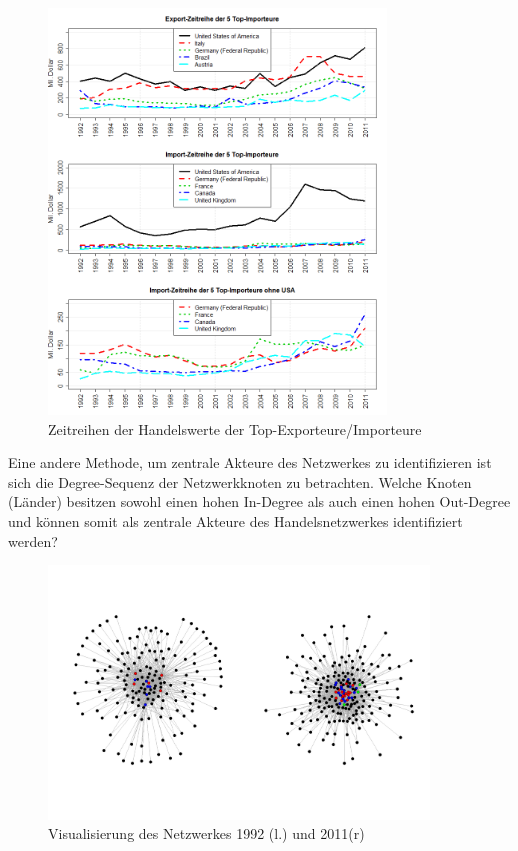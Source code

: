 \documentclass[a4paper,ngerman,oneside,titlepage,bibliography=totoc,11pt]{scrreprt}
\begin{document}
\begin{figure}[ht]
	\centering
		\includegraphics[width= 0.8\textwidth]{Grafiken/ts_tops.png}
	\caption{Zeitreihen der Handelswerte der Top-Exporteure/Importeure}
	\label{fig:ts_tops}
\end{figure}
Eine andere Methode, um zentrale Akteure des Netzwerkes zu identifizieren ist sich die Degree-Sequenz der Netzwerkknoten zu betrachten. Welche Knoten (Länder) besitzen sowohl einen hohen In-Degree als auch einen hohen Out-Degree und können somit als zentrale Akteure des Handelsnetzwerkes identifiziert werden?
\begin{figure}[ht]
	\centering
		\includegraphics[width=0.90\textwidth]{Grafiken/ts_network.png}
	\caption{Visualisierung des Netzwerkes 1992 (l.) und 2011(r)}
	\label{fig:ts_network}
\end{figure}
\end{document}

